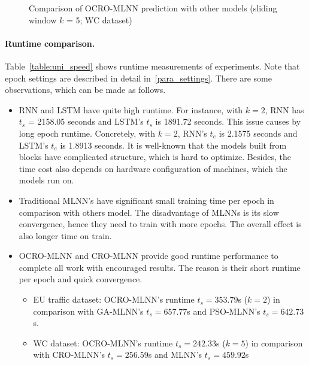 \documentclass[smallcondensed, natbib]{svjour3}     %
\begin{document}
{\begin{figure}[!ht]
\begin{minipage}[b]{0.33\linewidth}
  \end{minipage} 
  \caption{Comparison of OCRO-MLNN prediction with other models (sliding window $k$ = 5; WC dataset)} 
  \label{predict_wc_sliding5} 
\end{figure}

\paragraph{\textbf{Runtime comparison.}} Table~\ref{table:uni_speed} shows runtime measurements of experiments. Note that epoch settings are described in detail in~\ref{para_settings}. There are some observations, which can be made as follows.

\begin{itemize}
\item RNN and LSTM have quite high runtime. For instance, with $k = 2$, RNN has $t_s$ = 2158.05 seconds and LSTM's $t_s$ is 1891.72 seconds. This issue causes by long epoch runtime. Concretely, with $k = 2$, RNN's $t_e$ is 2.1575 seconds and LSTM's $t_e$ is 1.8913 seconds. It is well-known that the models built from blocks have complicated structure, which is hard to optimize. Besides, the time cost also depends on hardware configuration of machines, which the models run on.
\item Traditional MLNN's have significant small training time per epoch in comparison with others model. The disadvantage of MLNNs is its slow convergence, hence they need to train with more epochs. The overall effect is also longer time on train. 
\item OCRO-MLNN and CRO-MLNN provide good runtime performance to complete all work with encouraged results. The reason is their short runtime per epoch and quick convergence.
	\begin{itemize}
		\item EU traffic dataset: OCRO-MLNN's runtime $t_s = 353.79$s ($k = 2$) in comparison with GA-MLNN's $t_s = 657.77$s and PSO-MLNN's $t_s = 642.73$s.
		\item WC dataset: OCRO-MLNN's runtime $t_s = 242.33$s ($k = 5$) in comparison with CRO-MLNN's $t_s = 256.59$s and MLNN's $t_s = 459.92$s
	\end{itemize}


\end{itemize}}
\end{document}
